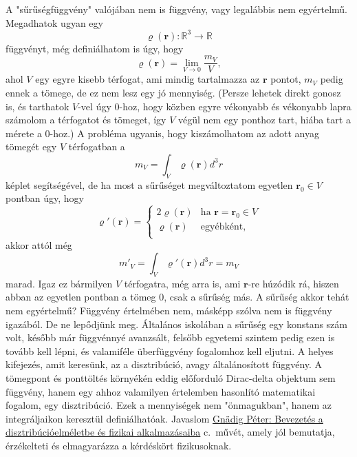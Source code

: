 \documentclass[12pt,a4paper]{scrartcl}
\let\mathbf\bm
\begin{document}
A "sűrűségfüggvény" valójában nem is függvény, vagy legalábbis nem egyértelmű. Megadhatok ugyan egy 
\[\varrho \left( {\mathbf{r}} \right):{\mathbb{R}^3} \to \mathbb{R}\]
függvényt, még definiálhatom is úgy, hogy 
\[\varrho \left( {\mathbf{r}} \right) = \mathop {\lim }\limits_{V \to 0} \frac{{{m_V}}}{V},\]
ahol $V$ egy egyre kisebb térfogat, ami mindig tartalmazza az ${\mathbf{r}}$ pontot, ${{m_V}}$ pedig ennek a tömege, de ez nem lesz egy jó mennyiség. (Persze lehetek direkt gonosz is, és tarthatok $V$-vel úgy 0-hoz, hogy közben egyre vékonyabb és vékonyabb lapra számolom a térfogatot és tömeget, így $V$ végül nem egy ponthoz tart, hiába tart a mérete a 0-hoz.) A probléma ugyanis, hogy kiszámolhatom az adott anyag tömegét egy $V$ térfogatban a
\[{m_V} = \int_V {\varrho \left( {\mathbf{r}} \right){d^3}r} \]
képlet segítségével, de ha most a sűrűséget megváltoztatom egyetlen ${{\mathbf{r}}_0} \in V$ pontban úgy, hogy 
\[\varrho '\left( {\mathbf{r}} \right) = \left\{ \begin{array}{lr}
  2\varrho \left( {\mathbf{r}} \right)&{\text{ha }}{\mathbf{r}} = {{\mathbf{r}}_0} \in V \\
  \varrho \left( {\mathbf{r}} \right)&{\text{egyébként,}} \\ 
\end{array}  \right.\]
akkor attól még
\begin{equation} \label{eq:ugyanaz_a_tomeg}
m{'_V} = \int_V {\varrho '\left( {\mathbf{r}} \right){d^3}r}  = {m_V}
\end{equation}
marad. Igaz ez bármilyen $V$ térfogatra, még arra is, ami ${\mathbf{r}}$-re húzódik rá, hiszen abban az egyetlen pontban a tömeg 0, csak a sűrűség más. A sűrűség akkor tehát nem egyértelmű? Függvény értelmében nem, másképp szólva nem is függvény igazából. De ne lepődjünk meg. Általános iskolában a sűrűség egy konstans szám volt, később már függvénnyé avanzsált, felsőbb egyetemi szintem pedig ezen is tovább kell lépni, és valamiféle überfüggvény fogalomhoz kell eljutni. A helyes kifejezés, amit keresünk, az a disztribúció, avagy általánosított függvény. A tömegpont és ponttöltés környékén eddig előforduló Dirac-delta objektum sem függvény, hanem egy ahhoz valamilyen értelemben hasonlító matematikai fogalom, egy disztribúció. Ezek a mennyiségek nem "önmagukban", hanem az integráljaikon keresztül definiálhatóak. Javaslom \href{http://physics.bme.hu/sites/physics.bme.hu/files/users/BMETE15AF31_kov/2012Gnadig_II.pdf}{Gnädig Péter: Bevezetés a disztribúcióelméletbe és fizikai alkalmazásaiba} c.\ művét, amely jól bemutatja, érzékelteti és elmagyarázza a kérdéskört fizikusoknak.
\end{document}
